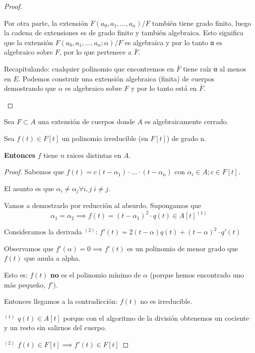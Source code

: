 \documentclass{apuntes}
\begin{document}
\begin{proof}
\begin{enumerate}
Por otra parte, la extensión $F(a_0, a_1, \dotsc, a_n) / F$ también tiene grado finito, luego la cadena de extensiones es de grado finito y también algebraica. Esto significa que la extensión $F(a_0, a_1, \dotsc, a_n; α) / F$ es algebraica y por lo tanto α es algebraico sobre $F$, por lo que pertenece a $\bar{F}$.

Recapitulando: cualquier polinomio que encontremos en $\bar{F}$ tiene raíz α al menos en $E$. Podemos construir una extensión algebraica (finita) de cuerpos demostrando que $α$ es algebraico sobre $F$ y por lo tanto está en $\bar{F}$.
\end{enumerate}
\end{proof}

\begin{theorem}
Sea $F\subset A$ una extensión de cuerpos donde $A$ es algebraicamente cerrado.

Sea $f(t) \in F[t]$ un polinomio irreducible (en $F[t]$) de grado n.

\textbf{Entonces} $f$ tiene $n$ raices distintas en $A$.
\end{theorem}

\begin{proof}
Sabemos que $f(t) = c(t-\alpha_1) \cdot ... \cdot (t-\alpha_n)$ con $\alpha_i\in A; c\in F[t]$.

El asunto es que $\alpha_i\neq \alpha_j \forall i,j \; i\neq j $.

Vamos a demostrarlo por reducción al absurdo. Supongamos que \[\alpha_1 = \alpha_2 \implies f(t) = (t-\alpha_1)^2 \cdot q(t) \in A[t]^{(1)}\]




Consideramos la derivada $^{(2)}$: $f'(t) = 2(t-\alpha) q(t) + (t-\alpha)^2\cdot q'(t)$

Observamos que $f'(\alpha) = 0 \implies f'(t)$ es un polinomio de menor grado que $f(t)$ que anula a alpha.


Esto es: $f(t)$ \textbf{no} es el polinomio mínimo de $\alpha$ (porque hemos encontrado uno más pequeño, $f'$).

Entonces llegamos a la contradicción: $f(t)$ no es irreducible.


$^{(1)}$ $q(t)\in A[t]$ porque con el algoritmo de la división obtenemos un cociente y un resto sin salirnos del cuerpo.

$^{(2)}$ $f(t)\in F[t] \implies f'(t)\in F[t]$
\end{proof}
\end{document}

